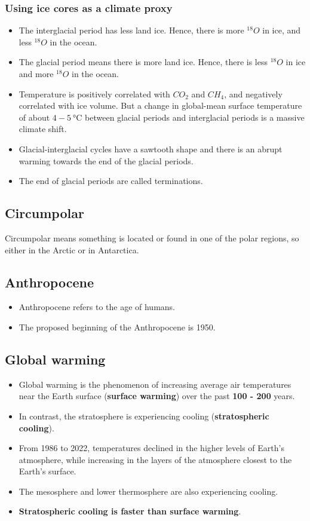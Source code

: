 \documentclass[11pt]{article}
\begin{document}
\subsubsection{Using ice cores as a climate proxy}
\label{sec:org3b6dd73}
\begin{itemize}
\item The interglacial period has less land ice. Hence, there is more \(^{18}O\) in ice, and less \(^{18}O\) in the ocean.
\item The glacial period means there is more land ice. Hence, there is less \(^{18}O\) in ice and more \(^{18}O\) in the ocean.
\item Temperature is positively correlated with \(CO_2\) and \(CH_4\), and negatively correlated with ice volume. But a change in global-mean surface temperature of about \(4 - 5 \ \unit{\degreeCelsius}\) between glacial periods and interglacial periods is a massive climate shift.
\item Glacial-interglacial cycles have a sawtooth shape and there is an abrupt warming towards the end of the glacial periods.
\item The end of glacial periods are called terminations.
\end{itemize}
\subsection{Circumpolar}
\label{sec:org00c4841}
Circumpolar means something is located or found in one of the polar regions, so either in the Arctic or in Antarctica.
\subsection{Anthropocene}
\label{sec:org63ad930}
\begin{itemize}
\item Anthropocene refers to the age of humans.
\item The proposed beginning of the Anthropocene is 1950.
\end{itemize}
\subsection{Global warming}
\label{sec:orga63ffdd}
\begin{itemize}
\item Global warming is the phenomenon of increasing average air temperatures near the Earth surface (\textbf{surface warming}) over the past \textbf{100 - 200} years.
\item In contrast, the stratosphere is experiencing cooling (\textbf{stratospheric cooling}).
\item From 1986 to 2022, temperatures declined in the higher levels of Earth's atmosphere, while increasing in the layers of the atmosphere closest to the Earth's surface.
\item The mesosphere and lower thermosphere are also experiencing cooling.
\item \textbf{Stratospheric cooling is faster than surface warming}.
\end{itemize}
\end{document}
